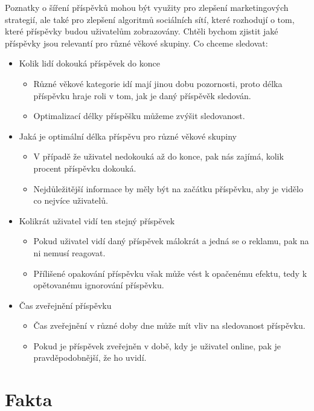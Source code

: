 \documentclass[11pt, a4paper]{article}
\begin{document}
Poznatky o šíření příspěvků mohou být využity pro zlepšení marketingových strategií,
ale také pro zlepšení algoritmů sociálních sítí, které rozhodují o tom, které příspěvky budou uživatelům zobrazovány.
Chtěli bychom zjistit jaké příspěvky jsou relevantí pro různé věkové skupiny.
Co chceme sledovat:
\begin{itemize}
    \item Kolik lidí dokouká příspěvek do konce
    \begin{itemize}
        \item Různé věkové kategorie idí mají jinou dobu pozornosti, proto délka příspěvku hraje roli v tom, jak je daný příspěvěk sledován.
        \item Optimalizací délky příspěšku můžeme zvýšit sledovanost.
    \end{itemize}
    \item Jaká je optimální délka příspěvu pro různé věkové skupiny
    \begin{itemize}
        \item V případě že uživatel nedokouká až do konce, pak nás zajímá, kolik procent příspěvku dokouká.
        \item Nejdůležitější informace by měly být na začátku příspěvku, aby je vidělo co nejvíce uživatelů.
    \end{itemize}
    \item Kolikrát uživatel vidí ten stejný příspěvek
    \begin{itemize}
        \item Pokud uživatel vidí daný příspěvek málokrát a jedná se o reklamu, pak na ni nemusí reagovat.
        \item Přílišené opakování příspěvku však může vést k opačenému efektu, tedy k opětovanému ignorování příspěvku.
    \end{itemize}
    \item Čas zveřejnění příspěvku 
    \begin{itemize}
        \item Čas zveřejnění v různé doby dne může mít vliv na sledovanost příspěvku.
        \item Pokud je příspěvek zveřejněn v době, kdy je uživatel online, pak je pravděpodobnější, že ho uvidí.
    \end{itemize}
\end{itemize}

\section{Fakta}
\end{document}
